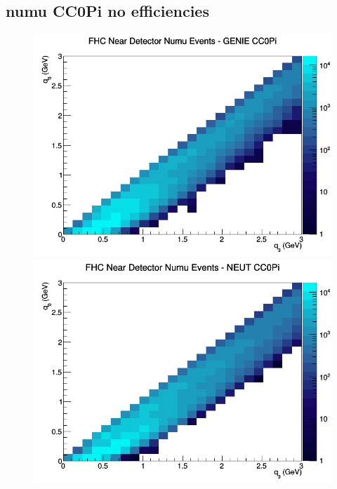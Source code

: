 \documentclass[12pt]{article}
\begin{document}
\subsection{numu CC0Pi no efficiencies}
\begin{figure}[h]
\includegraphics[width=\linewidth]{q0_q3/nominal/CC0Pi_FHC_ND_numu_q3_q0_GENIE.png}
\endminipage
{}
\includegraphics[width=\linewidth]{q0_q3/nominal/CC0Pi_FHC_ND_numu_q3_q0_NEUT.png}
\endminipage
{}

\end{figure}
\end{document}

